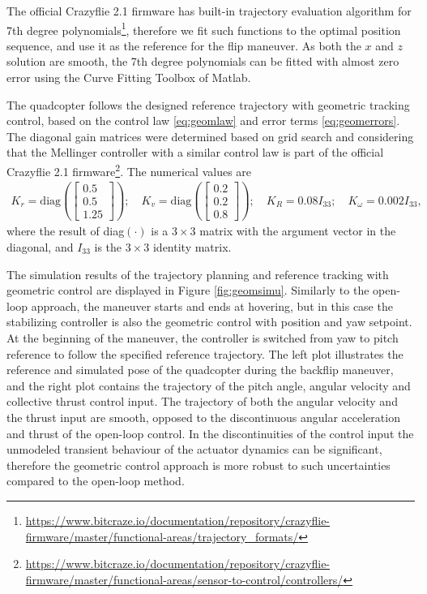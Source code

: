 The official Crazyflie 2.1 firmware has built-in trajectory evaluation algorithm for 7th degree polynomials\footnote{\url{https://www.bitcraze.io/documentation/repository/crazyflie-firmware/master/functional-areas/trajectory_formats/}}, therefore we fit such functions to the optimal position sequence, and use it as the reference for the flip maneuver. As both the $x$ and $z$ solution are smooth, the 7th degree polynomials can be fitted with almost zero error using the Curve Fitting Toolbox of Matlab.

The quadcopter follows the designed reference trajectory with geometric tracking control, based on the control law \eqref{eq:geomlaw} and error terms \eqref{eq:geomerrors}. The diagonal gain matrices were determined based on grid search and considering that the Mellinger controller \cite{mellinger2011} with a similar control law is part of the official Crazyflie 2.1 firmware\footnote{\url{https://www.bitcraze.io/documentation/repository/crazyflie-firmware/master/functional-areas/sensor-to-control/controllers/}}. The numerical values are
\begin{align*}
    K_r = \mathrm{diag}\left(\begin{bmatrix}
    0.5 \\ 0.5 \\ 1.25
    \end{bmatrix} \right);\quad K_v = \mathrm{diag}\left(\begin{bmatrix}
    0.2 \\ 0.2 \\ 0.8
    \end{bmatrix} \right);\quad K_R = 0.08 I_{33}; \quad K_\omega = 0.002 I_{33},
\end{align*}
 where the result of diag$(\cdot)$ is a $3\times 3$ matrix with the argument vector in the diagonal, and $I_{33}$ is the $3\times 3$ identity matrix.
 
 The simulation results of the trajectory planning and reference tracking with geometric control are displayed in Figure \ref{fig:geomsimu}. Similarly to the open-loop approach, the maneuver starts and ends at hovering, but in this case the stabilizing controller is also the geometric control with position and yaw setpoint. At the beginning of the maneuver, the controller is switched from yaw to pitch reference to follow the specified reference trajectory. The left plot illustrates the reference and simulated pose of the quadcopter during the backflip maneuver, and the right plot contains the trajectory of the pitch angle, angular velocity and collective thrust control input. The trajectory of both the angular velocity and the thrust input are smooth, opposed to the discontinuous angular acceleration and thrust of the open-loop control. In the discontinuities of the control input the unmodeled transient behaviour of the actuator dynamics can be significant, therefore the geometric control approach is more robust to such uncertainties compared to the open-loop method. 
 
